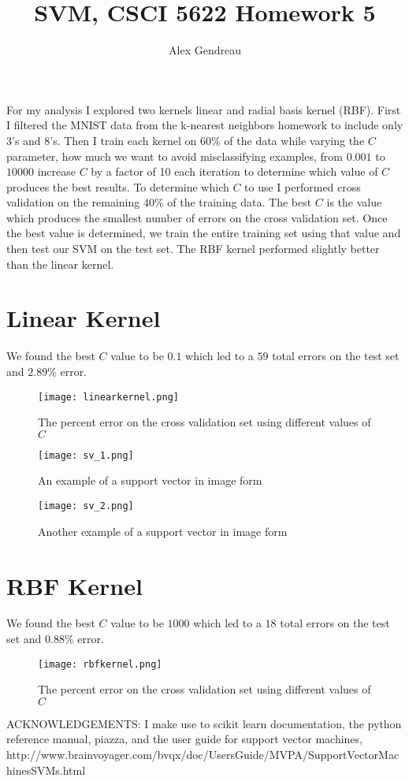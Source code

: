 \documentclass[110pt, oneside]{article}   	%
\title{SVM, CSCI 5622 Homework 5 }
\author{Alex Gendreau}
\begin{document}
\maketitle

For my analysis I explored two kernels linear and radial basis kernel (RBF).  First I filtered the MNIST data from the k-nearest neighbors homework to include only 3's and 8's.  Then I train each kernel on $60\%$ of the data while varying the $C$ parameter, how much we want to avoid misclassifying examples, from $0.001$ to $10000$ increase $C$ by a factor of 10 each iteration to determine which value of $C$ produces the best results.  To determine which $C$ to use I performed cross validation on the remaining $40\%$ of the training data.  The best $C$ is the value which produces the smallest number of errors on the cross validation set.  Once the best value is determined, we train the entire training set using that value and then test our SVM on the test set.  The RBF kernel performed slightly better than the linear kernel.

\section{Linear Kernel}
We found the best $C$ value to be $0.1$ which led to a $59$ total errors on the test set and $2.89\%$ error.  
\begin{figure}[H]
\centering
\texttt{[image: linearkernel.png]}
\caption{The percent error on the cross validation set using different values of $C$}
\end{figure}

\begin{figure}[H]
\centering
\texttt{[image: sv\_1.png]}
\caption{An example of a support vector in image form}
\end{figure}

\begin{figure}[H]
\centering
\texttt{[image: sv\_2.png]}
\caption{Another example of a support vector in image form}
\end{figure}

\section{RBF Kernel}
We found the best $C$ value to be $1000$ which led to a $18$ total errors on the test set and $0.88\%$ error.  
\begin{figure}[H]
\centering
\texttt{[image: rbfkernel.png]}
\caption{The percent error on the cross validation set using different values of $C$}
\end{figure}


ACKNOWLEDGEMENTS: I make use to scikit learn documentation, the python reference manual, piazza, and 
the user guide for support vector machines, \\
http://www.brainvoyager.com/bvqx/doc/UsersGuide/MVPA/SupportVectorMachinesSVMs.html
\end{document}
